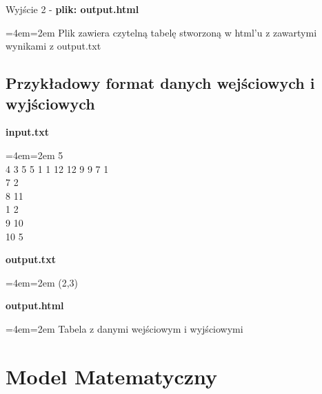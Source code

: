 \documentclass[12pt,a4paper]{article}
\newenvironment{blockquote}{%
  \par%
  \medskip
  \leftskip=4em\rightskip=2em%
  \noindent\ignorespaces}{%
  \par\medskip}
\begin{document}
            \noindent Wyjście 2 - \textbf{plik: output.html}
                \begin{blockquote}
                Plik zawiera czytelną tabelę stworzoną w html'u z zawartymi wynikami z output.txt
                \end{blockquote}
                
            
            
        
        \subsection{Przykładowy format danych wejściowych i wyjściowych}
        
            \textbf{input.txt}
            \begin{blockquote}
                12 5\\
4 3 5 5 1 1 12 12 9 9 7 1\\
7 2\\
8 11\\
1 2\\
9 10\\
10 5\\
            \end{blockquote}
                
            \noindent\textbf{output.txt}
            \begin{blockquote}
                (2,3)\\
            \end{blockquote}
            
            \noindent\textbf{output.html}
            \begin{blockquote}
                Tabela z danymi wejściowym i wyjściowymi
            \end{blockquote}
    
    
    \section{Model Matematyczny}
\end{document}
